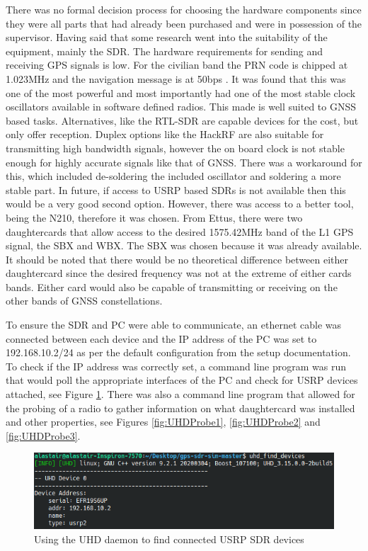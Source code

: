 There was no formal decision process for choosing the hardware components since they were all parts that had already been purchased and were in possession of the
supervisor. Having said that some research went into the suitability of the equipment, mainly the SDR. 
The hardware requirements for sending and receiving GPS signals is low. For the civilian band the PRN code is chipped at 1.023MHz and the navigation message is at 50bps \cite{RN57}.
It was found that this was one of the most powerful and most
importantly had one of the most stable clock oscillators available in software defined radios. This made is well suited to GNSS based tasks. Alternatives, like the
RTL-SDR are capable devices for the cost, but only offer reception. Duplex options like the HackRF are also suitable for transmitting high bandwidth signals, however the
on board clock is not stable enough for highly accurate signals like that of GNSS. There was a workaround for this, which included de-soldering the included oscillator and
soldering a more stable part. In future, if access to USRP based SDRs is not available then this would be a very good second option. However, there was access to a better
tool, being the N210, therefore it was chosen. From Ettus, there were two daughtercards that allow access to the desired 1575.42MHz band of the L1 GPS signal, the SBX and
WBX. The SBX was chosen because it was already available. It should be noted that there would be no theoretical difference between either daughtercard since the desired
frequency was not at the extreme of either cards bands. Either card would also be capable of transmitting or receiving on the other bands of GNSS constellations.

To ensure the SDR and PC were able to communicate, an ethernet cable was connected between each device and the IP address of the PC was set to 192.168.10.2/24 as per the
default configuration from the setup documentation. To check if the IP address was correctly set, a command line program was run that would poll the appropriate
interfaces of the PC and check for USRP devices attached, see Figure \ref{fig:UHDFind}. There was also a command line program that allowed for the probing of a
radio to gather information on what daughtercard was installed and other properties, see Figures \ref{fig:UHDProbe1}, \ref{fig:UHDProbe2} and \ref{fig:UHDProbe3}.

\begin{figure}[H]
    \begin{centering}
        \includegraphics[width=14cm,keepaspectratio]{Figures/uhd-find-devices.png}
        \caption{Using the UHD daemon to find connected USRP SDR devices}
    \label{fig:UHDFind}
    \end{centering}
\end{figure}

